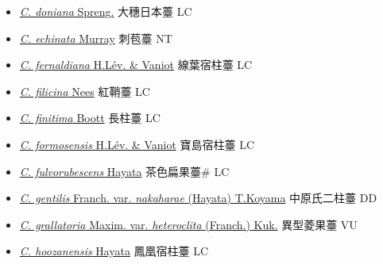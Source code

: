 \begin{itemize}
\begin{itemize}
        \item[] \href{http://www.theplantlist.org/tpl1.1/search?q=Carex+doniana}{\textit{C. doniana} Spreng.}   大穗日本薹 LC
        \item[] \href{http://www.theplantlist.org/tpl1.1/search?q=Carex+echinata}{\textit{C. echinata} Murray}   刺苞薹 NT
        \item[] \href{http://www.theplantlist.org/tpl1.1/search?q=Carex+fernaldiana}{\textit{C. fernaldiana} H.Lév. \& Vaniot}   線葉宿柱薹 LC
        \item[] \href{http://www.theplantlist.org/tpl1.1/search?q=Carex+filicina}{\textit{C. filicina} Nees}   紅鞘薹 LC
        \item[] \href{http://www.theplantlist.org/tpl1.1/search?q=Carex+finitima}{\textit{C. finitima} Boott}   長柱薹 LC
        \item[] \href{http://www.theplantlist.org/tpl1.1/search?q=Carex+formosensis}{\textit{C. formosensis} H.Lév. \& Vaniot}   寶島宿柱薹 LC
        \item[] \href{http://www.theplantlist.org/tpl1.1/search?q=Carex+fulvorubescens}{\textit{C. fulvorubescens} Hayata}   茶色扁果薹\# LC
        \item[] \href{http://www.theplantlist.org/tpl1.1/search?q=Carex+gentilis+var.+nakaharae}{\textit{C. gentilis} Franch. var. \textit{nakaharae} (Hayata) T.Koyama}   中原氏二柱薹 DD
        \item[] \href{http://www.theplantlist.org/tpl1.1/search?q=Carex+grallatoria+var.+heteroclita}{\textit{C. grallatoria} Maxim. var. \textit{heteroclita} (Franch.) Kuk.}   異型菱果薹 VU
        \item[] \href{http://www.theplantlist.org/tpl1.1/search?q=Carex+hoozanensis}{\textit{C. hoozanensis} Hayata}   鳳凰宿柱薹 LC

\end{itemize}
\end{itemize}
